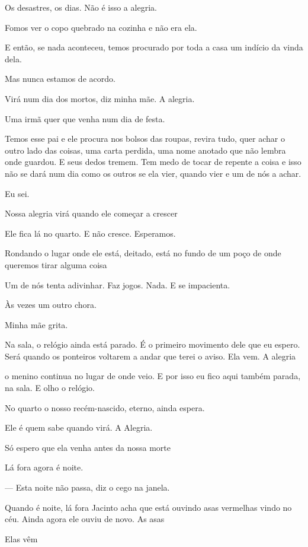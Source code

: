 Os desastres, os dias. Não é isso a alegria.

Fomos ver o copo quebrado na cozinha e não era ela.

E então, se nada aconteceu, temos procurado por toda a casa um indício
da vinda dela.

Mas nunca estamos de acordo.

Virá num dia dos mortos, diz minha mãe. A alegria.

Uma irmã quer que venha num dia de festa.

Temos esse pai e ele procura nos bolsos das roupas, revira tudo, quer
achar o outro lado das coisas, uma carta perdida, uma nome anotado que
não lembra onde guardou. E seus dedos tremem. Tem medo de tocar de
repente a coisa e isso não se dará num dia como os outros se ela vier,
quando vier e um de nós a achar.

Eu sei.

Nossa alegria virá quando ele começar a crescer

Ele fica lá no quarto. E não cresce. Esperamos.

Rondando o lugar onde ele está, deitado, está no fundo de um poço de
onde queremos tirar alguma coisa

Um de nós tenta adivinhar. Faz jogos. Nada. E se impacienta.

Às vezes um outro chora.

Minha mãe grita.

Na sala, o relógio ainda está parado. É o primeiro movimento dele que eu
espero. Será quando os ponteiros voltarem a andar que terei o aviso. Ela
vem. A alegria

o menino continua no lugar de onde veio. E por isso eu fico aqui também
parada, na sala. E olho o relógio.

No quarto o nosso recém-nascido, eterno, ainda espera.

Ele é quem sabe quando virá. A Alegria.

Só espero que ela venha antes da nossa morte

\breakk

\vspace*{4cm}

Lá fora agora é noite.

--- Esta noite não passa, diz o cego na janela.

Quando é noite, lá fora Jacinto acha que está ouvindo asas vermelhas
vindo no céu. Ainda agora ele ouviu de novo. As asas

Elas vêm

